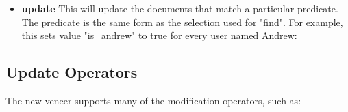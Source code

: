 \begin{itemize}
    \item \textbf{update}  This will update the documents that match a
        particular predicate.  The predicate is the same form as the selection
        used for "find".  For example, this sets value "is\_andrew" to true for
        every user named Andrew:

\end{itemize}

\subsection{Update Operators}

The new veneer supports many of the modification operators, such as:

